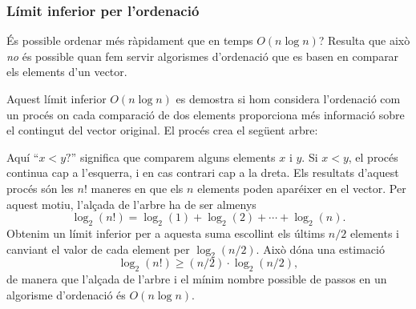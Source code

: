 \subsubsection{Límit inferior per l'ordenació}

És possible ordenar més ràpidament que en temps $O(n \log n)$?
Resulta que això \emph{no} és possible
quan fem servir algorismes d'ordenació
que es basen en comparar els elements d'un vector.

Aquest límit inferior $O(n \log n)$ es demostra si hom
considera l'ordenació com un procés on cada comparació
de dos elements proporciona més informació sobre el
contingut del vector original. El procés crea el següent arbre:

\begin{center}
\end{center}

Aquí ``$x<y?$'' significa que comparem alguns elements
$x$ i $y$. Si $x<y$, el procés continua cap a l'esquerra,
i en cas contrari cap a la dreta.
Els resultats d'aquest procés són les $n!$ maneres
en que els $n$ elements poden aparéixer en el vector.
Per aquest motiu, l'alçada de l'arbre
ha de ser almenys
\[ \log_2(n!) = \log_2(1)+\log_2(2)+\cdots+\log_2(n).\]
Obtenim un límit inferior per a aquesta suma
escollint els últims $n/2$ elements i
canviant el valor de cada element per $\log_2(n/2)$.
Això dóna una estimació
\[ \log_2(n!) \ge (n/2) \cdot \log_2(n/2),\]
de manera que l'alçada de l'arbre i el mínim
nombre possible de passos en un algorisme
d'ordenació és $O(n\log n)$.

